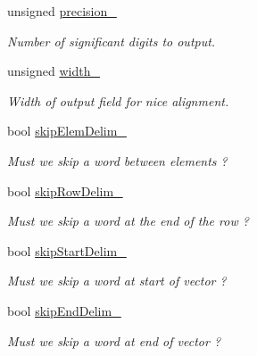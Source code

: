 \begin{DoxyCompactItemize}
unsigned \mbox{\hyperlink{classKalman_1_1KMatrixContextImpl_a193187a3472708192ab482118a17841f}{precision\+\_\+}}
\begin{DoxyCompactList}\small\item\em Number of significant digits to output. \end{DoxyCompactList}\item 
\mbox{\label{classKalman_1_1KMatrixContextImpl_ae7f4447be94c86021a8e33971413cde8}} 
unsigned \mbox{\hyperlink{classKalman_1_1KMatrixContextImpl_ae7f4447be94c86021a8e33971413cde8}{width\+\_\+}}
\begin{DoxyCompactList}\small\item\em Width of output field for nice alignment. \end{DoxyCompactList}\item 
\mbox{\label{classKalman_1_1KMatrixContextImpl_a145a82b204056e3c6144a109114b125f}} 
bool \mbox{\hyperlink{classKalman_1_1KMatrixContextImpl_a145a82b204056e3c6144a109114b125f}{skip\+Elem\+Delim\+\_\+}}
\begin{DoxyCompactList}\small\item\em Must we skip a word between elements ? \end{DoxyCompactList}\item 
\mbox{\label{classKalman_1_1KMatrixContextImpl_a175f1793f11a10bb1bcd00ba59d0953c}} 
bool \mbox{\hyperlink{classKalman_1_1KMatrixContextImpl_a175f1793f11a10bb1bcd00ba59d0953c}{skip\+Row\+Delim\+\_\+}}
\begin{DoxyCompactList}\small\item\em Must we skip a word at the end of the row ? \end{DoxyCompactList}\item 
\mbox{\label{classKalman_1_1KMatrixContextImpl_a43d8fe493431eb0ddae71f5738f31a1b}} 
bool \mbox{\hyperlink{classKalman_1_1KMatrixContextImpl_a43d8fe493431eb0ddae71f5738f31a1b}{skip\+Start\+Delim\+\_\+}}
\begin{DoxyCompactList}\small\item\em Must we skip a word at start of vector ? \end{DoxyCompactList}\item 
\mbox{\label{classKalman_1_1KMatrixContextImpl_a5c513407e4ed7d8bbab0cf3c91a81057}} 
bool \mbox{\hyperlink{classKalman_1_1KMatrixContextImpl_a5c513407e4ed7d8bbab0cf3c91a81057}{skip\+End\+Delim\+\_\+}}
\begin{DoxyCompactList}\small\item\em Must we skip a word at end of vector ? \end{DoxyCompactList}\end{DoxyCompactItemize}


